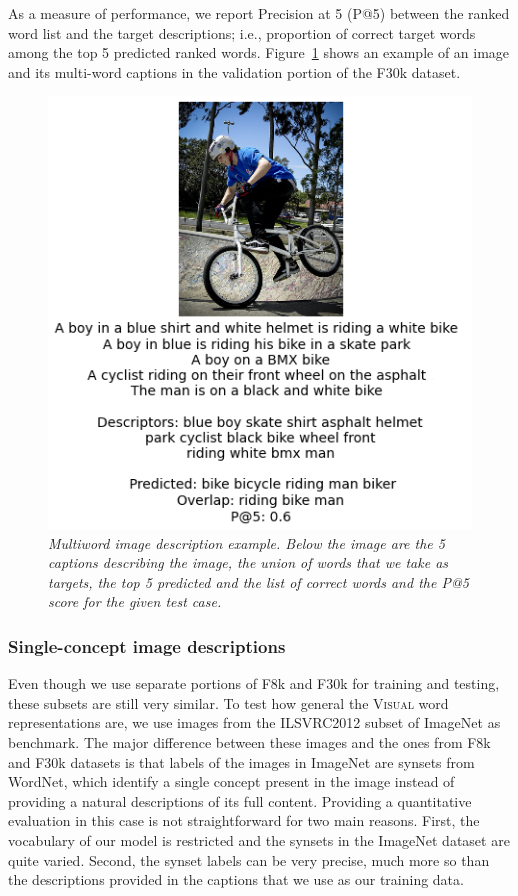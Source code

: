 As a measure of performance, we report Precision at 5 (P@5) between the ranked word list and the target descriptions; i.e., proportion of correct target words among the top 5 predicted ranked words. Figure~\ref{fig:multiword-descriptors} shows an example of an image and its multi-word captions in the validation
portion of the F30k dataset.

\begin{figure}
\centering
\includegraphics[scale=0.54]{chapters/TAL/bikeride}
\caption{\textit{Multiword image description example. Below the image
are the 5 captions describing the image, the union of words
that we take as targets, the top 5 predicted and the list of
correct words and the P@5 score for the given test case.}}
\label{fig:multiword-descriptors}
\end{figure}


\subsubsection{Single-concept image descriptions}
Even though we use separate portions of F8k and F30k for training and
testing, these subsets are still very similar. To test how general the
\textsc{Visual} word representations are, we use images from the ILSVRC2012
subset of ImageNet \citep{russakovsky2015imagenet} as benchmark. The major difference between these
images and the ones from F8k and F30k datasets is that labels of the
images in ImageNet are synsets from WordNet, which identify a single
concept present in the image instead of providing a natural
descriptions of its full content. Providing a quantitative evaluation
in this case is not straightforward for two main reasons. First, the
vocabulary of our model is restricted and the synsets in the ImageNet
dataset are quite varied. Second, the synset labels can be very precise,
much more so than the descriptions provided in the captions that we use
as our training data.

